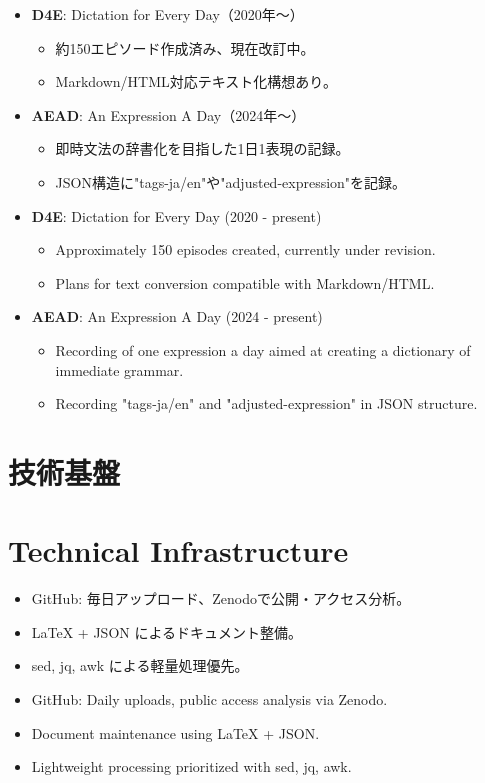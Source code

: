 \documentclass{bxjsarticle}
\begin{document}
\begin{itemize}
\ifJPN
  \item \textbf{D4E}: Dictation for Every Day（2020年〜）
  \begin{itemize}
    \item 約150エピソード作成済み、現在改訂中。
    \item Markdown/HTML対応テキスト化構想あり。
  \end{itemize}
  \item \textbf{AEAD}: An Expression A Day（2024年〜）
  \begin{itemize}
    \item 即時文法の辞書化を目指した1日1表現の記録。
    \item JSON構造に"tags-ja/en"や"adjusted-expression"を記録。
  \end{itemize}
\else
  \item \textbf{D4E}: Dictation for Every Day (2020 - present)
  \begin{itemize}
    \item Approximately 150 episodes created, currently under revision.
    \item Plans for text conversion compatible with Markdown/HTML.
  \end{itemize}
  \item \textbf{AEAD}: An Expression A Day (2024 - present)
  \begin{itemize}
    \item Recording of one expression a day aimed at creating a dictionary of immediate grammar.
    \item Recording "tags-ja/en" and "adjusted-expression" in JSON structure.
  \end{itemize}
\fi
\end{itemize}

\ifJPN
\section{技術基盤}
\else
\section{Technical Infrastructure}
\fi

\begin{itemize}
\ifJPN
  \item GitHub: 毎日アップロード、Zenodoで公開・アクセス分析。
  \item LaTeX + JSON によるドキュメント整備。
  \item sed, jq, awk による軽量処理優先。
\else
  \item GitHub: Daily uploads, public access analysis via Zenodo.
  \item Document maintenance using LaTeX + JSON.
  \item Lightweight processing prioritized with sed, jq, awk.
\fi
\end{itemize}
\end{document}
